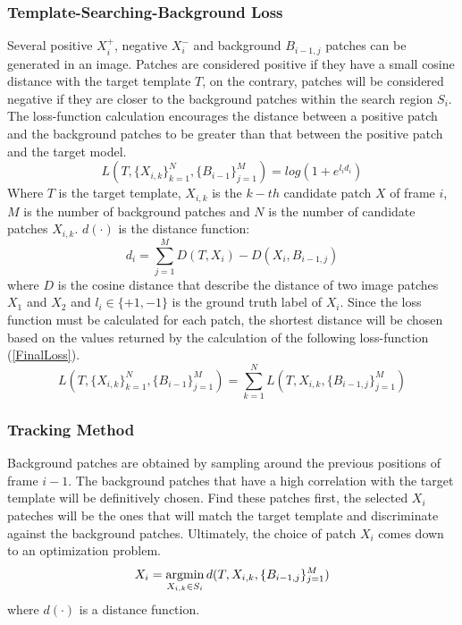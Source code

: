 \subsubsection{Template-Searching-Background Loss}
Several positive $X^+_i$, negative $X^-_i$ and background $B_{i-1,j}$ patches can be 
generated in an image. Patches are considered positive if they have a small 
cosine distance with the target template $T$, on the contrary, patches will be 
considered negative if they are closer to the background patches within the 
search region $S_i$. The loss-function calculation encourages the distance 
between a positive patch and the background patches to be greater than that 
between the positive patch and the target model.
\begin{equation}
    L(T,\{X_{i,k}\}^N_{k=1}, \{B_{i-1}\}^M_{j=1}) = log(1+e^{l_id_i})
\end{equation}
Where $T$ is the target template, $X_{i,k}$ is the $k-th$ candidate patch $X$ of frame 
$i$, $M$ is the number of background patches and $N$ is the number of candidate 
patches $X_{i,k}$. $d(\cdot)$ is the distance function:
\begin{equation}\label{distanceFunc}
    d_i=\sum^M_{j=1} D(T, X_i) - D(X_i, B_{i-1,j})
\end{equation}
where $D$ is the cosine distance that describe the distance of two image patches 
$X_1$ and $X_2$ and $l_i \in \{+1,-1\}$ is the ground truth label of $X_i$. Since the 
loss function must be calculated for each patch, the shortest distance will 
be chosen based on the values returned by the calculation of the following 
loss-function (\ref{FinalLoss}).
\begin{equation}\label{FinalLoss}
    L(T,\{X_{i,k}\}^N_{k=1}, \{B_{i-1}\}^M_{j=1}) = \sum_{k=1}^NL(T,X_{i,k}, \{B_{i-1,j}\}^M_{j=1})
\end{equation}

\subsubsection{Tracking Method}
Background patches are obtained by sampling around the previous positions 
of frame $i-1$. The background patches that have a high correlation with 
the target template will be definitively chosen. Find these patches first, the 
selected $X_i$ pateches will be the ones that will match the target template and 
discriminate against the background patches. Ultimately, the choice of 
patch $X_i$ comes down to an optimization problem.
\begin{equation}
    X_i = \operatorname*{argmin}_{X_{i,k} \in S_i}d(T,X_{i,k}, \{B_{i-1,j}\}^M_{j=1})
\end{equation}
where $d(\cdot)$ is a distance function.


